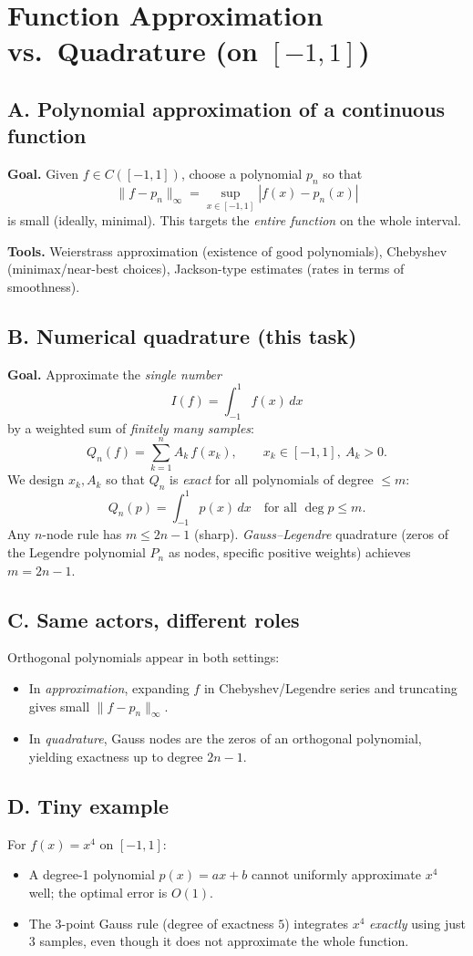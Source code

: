 \documentclass[11pt,a4paper]{article}
\theoremstyle{definition}
\theoremstyle{definition}
\theoremstyle{plain}
\theoremstyle{remark}
\begin{document}
\section*{Function Approximation vs.\ Quadrature (on \([-1,1]\))}

\subsection*{A. Polynomial approximation of a continuous function}
\textbf{Goal.} Given \(f\in C([-1,1])\), choose a polynomial \(p_n\) so that
\[
\|f-p_n\|_\infty=\sup_{x\in[-1,1]} |f(x)-p_n(x)|
\]
is small (ideally, minimal). This targets the \emph{entire function} on the whole interval.

\textbf{Tools.} Weierstrass approximation (existence of good polynomials), Chebyshev
(minimax/near-best choices), Jackson-type estimates (rates in terms of smoothness).

\subsection*{B. Numerical quadrature (this task)}
\textbf{Goal.} Approximate the \emph{single number}
\[
I(f)=\int_{-1}^{1} f(x)\,dx
\]
by a weighted sum of \emph{finitely many samples}:
\[
Q_n(f)=\sum_{k=1}^{n} A_k\,f(x_k),\qquad x_k\in[-1,1],\ A_k>0.
\]
We design \(x_k,A_k\) so that \(Q_n\) is \emph{exact} for all polynomials of degree
\(\le m\):
\[
Q_n(p)=\int_{-1}^{1} p(x)\,dx\quad\text{for all }\deg p\le m.
\]
Any \(n\)-node rule has \(m\le 2n-1\) (sharp). \emph{Gauss--Legendre} quadrature
(zeros of the Legendre polynomial \(P_n\) as nodes, specific positive weights)
achieves \(m=2n-1\).

\subsection*{C. Same actors, different roles}
Orthogonal polynomials appear in both settings:
\begin{itemize}
	\item In \emph{approximation}, expanding \(f\) in Chebyshev/Legendre series and truncating gives small \(\|f-p_n\|_\infty\).
	\item In \emph{quadrature}, Gauss nodes are the zeros of an orthogonal polynomial, yielding exactness up to degree \(2n-1\).
\end{itemize}

\subsection*{D. Tiny example}
For \(f(x)=x^4\) on \([-1,1]\):
\begin{itemize}
	\item A degree-1 polynomial \(p(x)=ax+b\) cannot uniformly approximate \(x^4\) well; the optimal error is \(O(1)\).
	\item The 3-point Gauss rule (degree of exactness \(5\)) integrates \(x^4\) \emph{exactly} using just 3 samples, even though it does not approximate the whole function.
\end{itemize}
\end{document}
